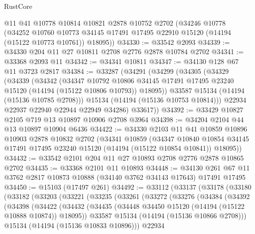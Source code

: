 \begin{lexlean}{RustCore}
\begin{coremodule}
    @11
    @41
    @10778
    @10814
    @10821
    @2878
    @10752
    @2702
    (@34246
      @10778
      (@34252
        @10760
        @10773
        @34145
        @17491
        @17495
        @22910
        @15120
        (@14194 (@15122 @10773 @10761))
        @18095))
@34330 := @33542 @2093
@34339 := @34330 @204 @11 @27 @10811 @2708 @2776 @2878 @10784 @2702
@34341 := @33368 @2093 @11
@34342 := @34341 @10811
@34347 := @34130 @128 @67 @11 @3723 @2817
@34384 := @33287
    (@34291
      (@34299
        (@34305
          (@34329
            (@34339
              (@34342
                (@34347
                  @10792
                  @10806
                  @34145
                  @17491
                  @17495
                  @23240
                  @15120
                  (@14194 (@15122 @10806 @10793))
                  @18095))
              @33587
              @15134
              (@14194 (@15136 @10785 @2708)))
            @15134
            (@14194 (@15136 @10753 @10814)))
          @22934
          @22937
          @22940
          @22944
          @22949
          @34286)
        @33617))
@34392 := @33429 @10827 @2105 @719 @13 @10897 @10906 @2708 @3964
@34398 := @34204 @2104 @44 @13 @10897 @10904 @6436
@34422 := @34330
    @2103
    @11
    @41
    @10859
    @10896
    @10903
    @2878
    @10832
    @2702
    (@34341
      @10859
      (@34347
        @10840
        @10854
        @34145
        @17491
        @17495
        @23240
        @15120
        (@14194 (@15122 @10854 @10841))
        @18095))
@34432 := @33542 @2101 @204 @11 @27 @10893 @2708 @2776 @2878 @10865 @2702
@34435 := @33368 @2101 @11 @10893
@34448 := @34130 @261 @67 @11 @3762 @2817 @10873 @10888 (@34140 @3762 @34143 @17643) @17491 @17495
@34450 := @15103 (@17497 @261)
@34492 := @33112
    (@33137
      (@33178
        (@33180
          (@33182
            (@33203
              (@33221
                (@33235
                  (@33261
                    (@33272
                      (@33276
                        (@34384
                          (@34392
                            (@34398
                              (@34422
                                (@34432
                                  (@34435
                                    (@34448 @34450 @15120 (@14194 (@15122 @10888 @10874)) @18095))
                                  @33587
                                  @15134
                                  (@14194 (@15136 @10866 @2708)))
                                @15134
                                (@14194 (@15136 @10833 @10896)))
                              @22934

\end{coremodule}
\end{lexlean}
